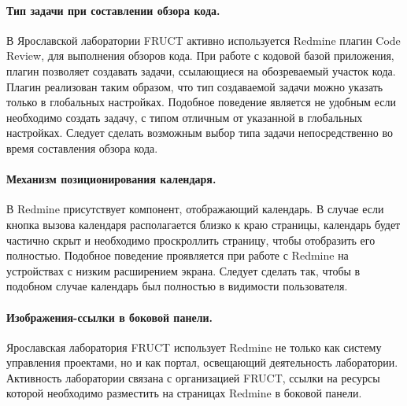 \paragraph{Тип задачи при составлении обзора кода.}
В Ярославской лаборатории FRUCT активно используется Redmine плагин Code
Review, для выполнения обзоров кода. При работе с кодовой базой приложения,
плагин позволяет создавать задачи, ссылающиеся на обозреваемый участок кода.
Плагин реализован таким образом, что тип создаваемой задачи можно указать
только в глобальных настройках. Подобное поведение является не удобным
если необходимо создать задачу, с типом отличным от указанной в глобальных
настройках. Следует сделать возможным выбор типа задачи непосредственно во
время составления обзора кода.

\paragraph{Механизм позиционирования календаря.}
В Redmine присутствует компонент, отображающий календарь. В случае если кнопка
вызова календаря располагается близко к краю страницы, календарь
будет частично скрыт и необходимо проскроллить страницу, чтобы отобразить его
полностью. Подобное поведение проявляется при работе с Redmine на устройствах с
низким расширением экрана. Следует сделать так, чтобы в подобном случае
календарь был полностью в видимости пользователя.

\paragraph{Изображения-ссылки в боковой панели.}
Ярославская лаборатория FRUCT использует Redmine не только как систему
управления проектами, но и как портал, освещающий деятельность лаборатории.
Активность лаборатории связана с организацией FRUCT, ссылки на ресурсы которой
необходимо разместить на страницах Redmine в боковой панели.


